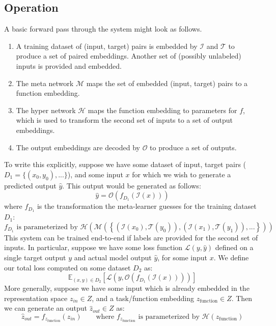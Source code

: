 \documentclass{article}
\begin{document}
\subsection{Operation}
A basic forward pass through the system might look as follows.
\begin{enumerate}
\item A training dataset of (input, target) pairs is embedded by $\mathcal{I}$ and $\mathcal{T}$ to produce a set of paired embeddings. Another set of (possibly unlabeled) inputs is provided and embedded.
\item The meta network $\mathcal{M}$ maps the set of embedded (input, target) pairs to a function embedding.
\item The hyper network $\mathcal{H}$ maps the function embedding to parameters for $f$, which is used to transform the second set of inputs to a set of output embeddings.
\item The output embeddings are decoded by $\mathcal{O}$ to produce a set of outputs.
\end{enumerate}
To write this explicitly, suppose we have some dataset of input, target pairs ($D_1 = \{(x_0, y_0), ...\}$), and some input $x$ for which we wish to generate a predicted output $\hat{y}$. This output would be generated as follows: 
\[\hat{y} = \mathcal{O}\left(f_{D_1}\left(\mathcal{I} \left(x\right)\right) \right)\]
where $f_{D_1}$ is the transformation the meta-learner guesses for the training dataset $D_1$:
\[f_{D_1} \text{ is parameterized by } \mathcal{H}\left(\mathcal{M}\left( \left\{\left(\mathcal{I}\left(x_0\right), \mathcal{T}\left(y_0\right) \right), \left(\mathcal{I}\left(x_1\right), \mathcal{T}\left(y_1\right) \right), ... \right\}\right)\right)\]
This system can be trained end-to-end if labels are provided for the second set of inputs. In particular, suppose we have some loss function $\mathcal{L}(y, \hat{y})$ defined on a single target output $y$ and actual model output $\hat{y}$, for some input $x$. We define our total loss computed on some dataset $D_2$ as:
\[\mathbb{E}_{(x, y)\in {D}_2} \left[ \mathcal{L}\left(y, \mathcal{O}\left(f_{D_1}\left(\mathcal{I} \left(x\right)\right) \right)\right)\right]\]
More generally, suppose we have some input which is already embedded in the representation space $z_{in} \in Z$, and a task/function embedding $z_{\text{function}} \in Z$. Then we can generate an output $\hat{z}_{out} \in Z$ as:  
\[\hat{z}_{out} = f_{z_{\text{function}}}(z_{in}) \qquad \text{where } f_{z_{\text{function}}} \text{ is parameterized by } \mathcal{H}\left(z_{\text{function}}\right)\]
\end{document}
